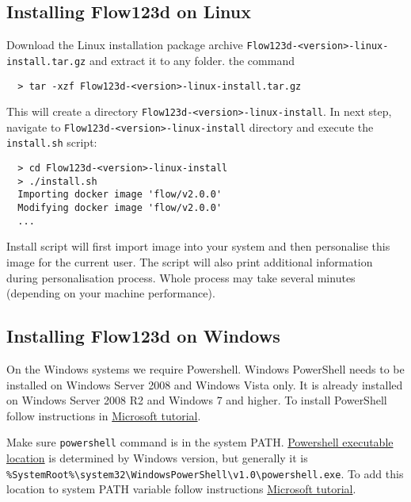 \documentclass[12pt,a4paper]{report}
\begin{document}
\subsection{Installing Flow123d on Linux}
Download the Linux installation package archive \verb'Flow123d-<version>-linux-install.tar.gz' and extract it to any folder.
the command
\begin{verbatim}
  > tar -xzf Flow123d-<version>-linux-install.tar.gz 
\end{verbatim}
This will create a directory \verb'Flow123d-<version>-linux-install'. In next step, navigate to \verb'Flow123d-<version>-linux-install' directory
and execute the \verb'install.sh' script:
\begin{verbatim}
  > cd Flow123d-<version>-linux-install
  > ./install.sh
  Importing docker image 'flow/v2.0.0'
  Modifying docker image 'flow/v2.0.0'
  ...
\end{verbatim}
Install script will first import image into your system and then personalise this image for the current user. The script will also print
additional information during personalisation process. Whole process may take several minutes (depending on your machine performance).


\subsection{Installing Flow123d on Windows}
On the Windows systems we require Powershell. Windows PowerShell needs to be installed on Windows Server 2008 and Windows Vista only.
It is already installed on Windows Server 2008 R2 and Windows 7 and higher. To install PowerShell follow instructions in 
\href{https://msdn.microsoft.com/en-us/powershell/scripting/setup/installing-windows-powershell}{Microsoft tutorial}.

Make sure \verb'powershell' command is in the system PATH. 
\href{http://www.powershelladmin.com/wiki/PowerShell_Executables_File_System_Locations}{Powershell executable location}
 is determined by Windows version, but generally it is \\\verb'%SystemRoot%\system32\WindowsPowerShell\v1.0\powershell.exe'. To add
 this location to system PATH variable follow instructions \href{https://msdn.microsoft.com/en-us/library/office/ee537574(v=office.14).aspx}{Microsoft tutorial}.
\end{document}
